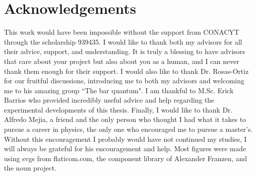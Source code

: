 \documentclass[12pt]{book}
\begin{document}

\chapter*{Acknowledgements}
\thispagestyle{plain}

This work would have been impossible without the support from CONACYT through the scholarship 939435. I would like to thank both my advisors for all their advice, support, and understanding. It is truly a blessing to have advisors that care about your project but also about you as a human, and I can never thank them enough for their support. I would also like to thank Dr. Rosas-Ortiz for our fruitful discussions, introducing me to both my advisors and welcoming me to his amazing group ``The bar quantum". I am thankful to M.Sc. Erick Barrios who provided incredibly useful advice and help regarding the experimental developments of this thesis. Finally, I would like to thank Dr. Alfredo Mejia, a friend and the only person who thought I had what it takes to pursue a career in physics, the only one who encouraged me to pursue a master's. Without this encouragement I probably would have not continued my studies, I will always be grateful for his encouragement and help. Most figures were made using svgs from flaticom.com, the component library of Alexander Franzen, and the noun project.
\end{document}

